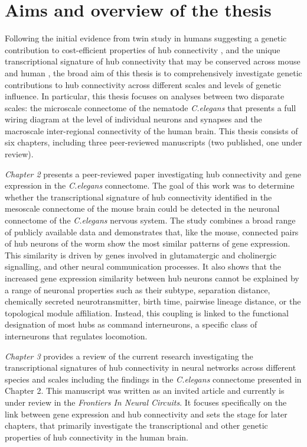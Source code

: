 \section{Aims and overview of the thesis}

Following the initial evidence from twin study in humans suggesting a genetic contribution to cost-efficient properties of hub connectivity \citep{Fornito2011}, and the unique transcriptional signature of hub connectivity that may be conserved across mouse and human \citep{Vertes2016b,Fulcher2016}, the broad aim of this thesis is to comprehensively investigate genetic contributions to hub connectivity across different scales and levels of genetic influence. In particular, this thesis focuses on analyses between two disparate scales: the microscale connectome of the nematode \textit{C.elegans} that presents a full wiring diagram at the level of individual neurons and synapses and the macroscale inter-regional connectivity of the human brain. This thesis consists of six chapters, including three peer-reviewed manuscripts (two published, one under review).

\textit{Chapter 2} presents a peer-reviewed paper investigating hub connectivity and gene expression in the \textit{C.elegans} connectome. The goal of this work was to determine whether the transcriptional signature of hub connectivity identified in the mesoscale connectome of the mouse brain \mbox{\citep{Fulcher2016}} could be detected in the neuronal connectome of the \textit{C.elegans} nervous system. The study combines a broad range of publicly available data and demonstrates that, like the mouse, connected pairs of hub neurons of the worm show the most similar patterns of gene expression. This similarity is driven by genes involved in glutamatergic and cholinergic signalling, and other neural communication processes. It also shows that the increased gene expression similarity between hub neurons cannot be explained by a range of neuronal properties such as their subtype, separation distance, chemically secreted neurotransmitter, birth time, pairwise lineage distance, or the topological module affiliation. Instead, this coupling is linked to the functional designation of most hubs as command interneurons, a specific class of interneurons that regulates locomotion.

\textit{Chapter 3} provides a review of the current research investigating the transcriptional signatures of hub connectivity in neural networks across different species and scales including the findings in the \textit{C.elegans} connectome presented in Chapter 2. This manuscript was written as an invited article and currently is under review in the \textit{Frontiers In Neural Circuits}. It focuses specifically on the link between gene expression and hub connectivity and sets the stage for later chapters, that primarily investigate the transcriptional and other genetic properties of hub connectivity in the human brain.


